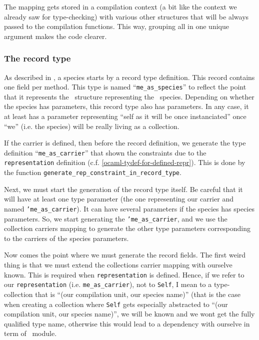 \medskip
The mapping gets stored in a compilation context (a bit like the
context we already saw for type-checking) with various other
structures that will be always passed to the compilation
functions. This way, grouping all in one unique argument makes the
code clearer.

\subsubsection{The record type}
As described in \label{code-gen-model}, a species starts by a record
type definition. This record contains one field per method. This type
is named ``{\tt me\_as\_species}'' to reflect the point that it
represents the \ocaml\ structure representing the \focal\ species.
Depending on whether the species has parameters, this record type also
has parameters. In any case, it at least has a parameter representing
``self as it will be once instanciated'' once ``we'' (i.e. the
species) will be really living as a collection.

\medskip
If the carrier is defined, then before the record definition, we
generate the type definition ``{\tt me\_as\_carrier}'' that shown the
constraints due to the {\tt representation} definition
(c.f. \ref{ocaml-tydef-for-defined-repr}). This is done by the
function {\tt generate\_rep\_constraint\_in\_record\_type}.

\medskip
Next, we must start the generation of the record type itself. Be
careful that it will have at least one type parameter (the one
representing our carrier and named {\tt 'me\_as\_carrier}). It can
have several parameters if the species has species parameters. So, we
start generating the {\tt 'me\_as\_carrier}, and we use the collection
carriers mapping to generate the other type parameters corresponding
to the carriers of the species parameters.

\medskip
Now comes the point where we must generate the record fields. The
first weird thing is that we must extend the collections carrier mapping
with ourselve known. This is required when {\tt representation} is defined. 
Hence, if we refer to our {\tt representation} (i.e.
{\tt me\_as\_carrier}), not to {\tt Self}, I mean to a type-collection
that is ``(our compilation unit, our species name)'' (that is the case
when creating a collection where {\tt Self} gets especially abstracted
to ``(our compilation unit, our species name)'', we  will be known and
we wont get the fully qualified type name, otherwise this would lead
to a dependency with ourselve in term of \ocaml\ module.

